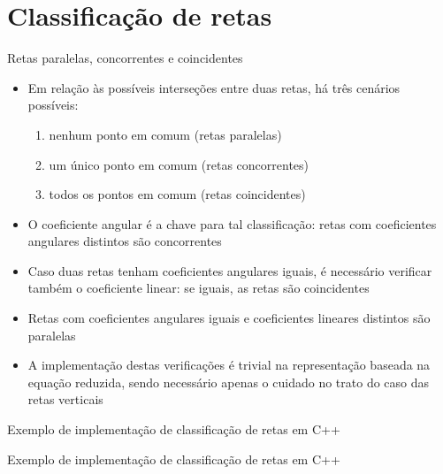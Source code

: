 \section{Classificação de retas}

\begin{frame}[fragile]{Retas paralelas, concorrentes e coincidentes}

    \begin{itemize}
        \item Em relação às possíveis interseções entre duas retas, há três cenários possíveis: 

        \begin{enumerate}
            \item nenhum ponto em comum (retas paralelas)
            \item um único ponto em comum  (retas concorrentes)
            \item todos os pontos em comum (retas coincidentes)
        \end{enumerate}

        \item O coeficiente angular é a chave para tal classificação: retas com coeficientes 
            angulares distintos são concorrentes

        \item Caso duas retas tenham coeficientes angulares iguais, é necessário verificar também 
            o coeficiente linear: se iguais, as retas são coincidentes

        \item Retas com coeficientes angulares iguais e coeficientes lineares distintos são paralelas
        \item A implementação destas verificações é trivial na representação baseada na equação reduzida, sendo necessário apenas o cuidado no trato do caso das retas verticais
    \end{itemize}

\end{frame}

\begin{frame}[fragile]{Exemplo de implementação de classificação de retas em C++}
\end{frame}

\begin{frame}[fragile]{Exemplo de implementação de classificação de retas em C++}
\end{frame}

